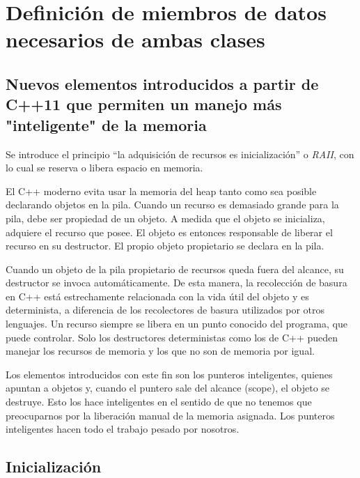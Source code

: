 \documentclass[10pt]{article}
\begin{document}
\vspace{2em}
\section{Definici\'on de miembros de datos necesarios de ambas clases}

\subsection{Nuevos elementos introducidos a partir de C++11 que permiten un manejo más "inteligente" de la memoria}

Se introduce el principio ``la adquisición de recursos es inicialización'' o \textit{RAII}, con lo cual se reserva o libera espacio en memoria. 

El C++ moderno evita usar la memoria del heap tanto como sea posible declarando objetos en la pila. Cuando un recurso es demasiado grande para la pila, debe ser propiedad de un objeto. A medida que el objeto se inicializa, adquiere el recurso que posee. El objeto es entonces responsable de liberar el recurso en su destructor. El propio objeto propietario se declara en la pila.  

Cuando un objeto de la pila propietario de recursos queda fuera del alcance, su destructor se invoca automáticamente. De esta manera, la recolección de basura en C++ está estrechamente relacionada con la vida útil del objeto y es determinista, a diferencia de los recolectores de basura utilizados por otros lenguajes. Un recurso siempre se libera en un punto conocido del programa, que puede controlar. Solo los destructores deterministas como los de C++ pueden manejar los recursos de memoria y los que no son de memoria por igual.

Los elementos introducidos con este fin son los punteros inteligentes, quienes apuntan a objetos y, cuando el puntero sale del alcance (scope), el objeto se destruye. Esto los hace inteligentes en el sentido de que no tenemos que preocuparnos por la liberaci\'on manual de la memoria asignada. Los punteros inteligentes hacen todo el trabajo pesado por nosotros.

\subsection{Inicializaci\'on}
\end{document}
